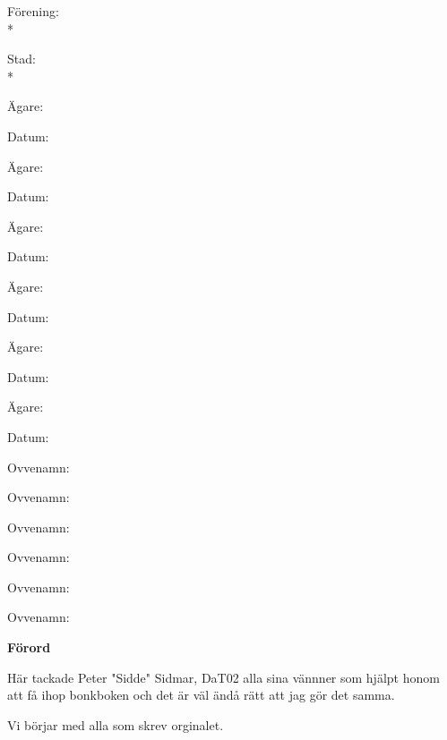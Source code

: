 \pagestyle{Inledning}


Förening: \hrulefill\\*%

Stad: \hrulefill\\*%



\begin{multicols}{2}
  Ägare: \hrulefill%

  Datum: \hrulefill%

  Ägare: \hrulefill%

  Datum: \hrulefill%

  Ägare: \hrulefill%

  Datum: \hrulefill%

  Ägare: \hrulefill%

  Datum: \hrulefill%

  Ägare: \hrulefill%

  Datum: \hrulefill%

  Ägare: \hrulefill%

  Datum: \hrulefill%

  \hfill

  Ovvenamn: \hrulefill%

  \hfill

  Ovvenamn: \hrulefill%

  \hfill

  Ovvenamn: \hrulefill%

  \hfill

  Ovvenamn: \hrulefill%

  \hfill

  Ovvenamn: \hrulefill%

  \hfill

  Ovvenamn: \hrulefill%

  \hfill
\end{multicols}



\newpage

\textbf{Förord}

Här tackade Peter "Sidde" Sidmar, DaT02 alla sina vännner som hjälpt honom
att få ihop bonkboken och det är väl ändå rätt att jag gör det samma.

Vi börjar med alla som skrev orginalet.

